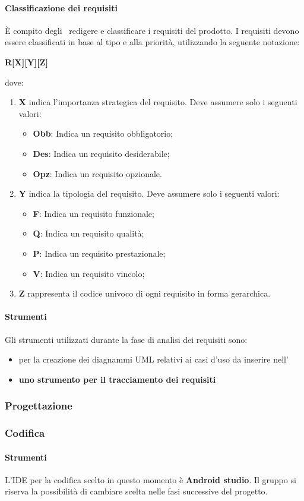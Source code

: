 \documentclass[../NormeProgetto.tex]{subfiles}
\begin{document}
			\paragraph{Classificazione dei requisiti}
			È compito degli \analisti\ redigere e classificare i requisiti del prodotto.  I requisiti devono essere classificati in base al tipo e alla priorità, utilizzando la seguente notazione:
			\begin{center}\textbf{R[X][Y][Z]}\end{center} dove:
				\begin{enumerate}
					\item \textbf{X} indica l'importanza strategica del requisito. Deve assumere solo i seguenti valori:
						\begin{itemize}
							\item \textbf{Obb}: Indica un requisito obbligatorio;
							\item \textbf{Des}: Indica un requisito desiderabile;
							\item \textbf{Opz}: Indica un requisito opzionale.
						\end{itemize}
					\item \textbf{Y} indica la tipologia del requisito. Deve assumere solo i seguenti valori:
						\begin{itemize}
							\item \textbf{F}: Indica un requisito funzionale;
							\item \textbf{Q}: Indica un requisito qualità;
							\item \textbf{P}: Indica un requisito prestazionale;
							\item \textbf{V}: Indica un requisito vincolo;
						\end{itemize}
					\item \textbf{Z} rappresenta il codice univoco di ogni requisito in forma gerarchica.
				\end{enumerate}
			\paragraph{Strumenti}
			Gli strumenti utilizzati durante la fase di analisi dei requisiti sono:
			\begin{itemize}
				\item {} per la creazione dei diagnammi UML relativi ai casi d'uso da inserire nell'\analisideirequisiti\
				\item \textbf{uno strumento per il tracciamento dei requisiti}
			\end{itemize}
		\subsubsection{Progettazione}
		\subsubsection{Codifica}
			\paragraph{Strumenti}
			L'IDE per la codifica scelto in questo momento è \textbf{Android studio}. Il gruppo si riserva la possibilità di cambiare scelta nelle fasi successive del progetto.
\end{document}
